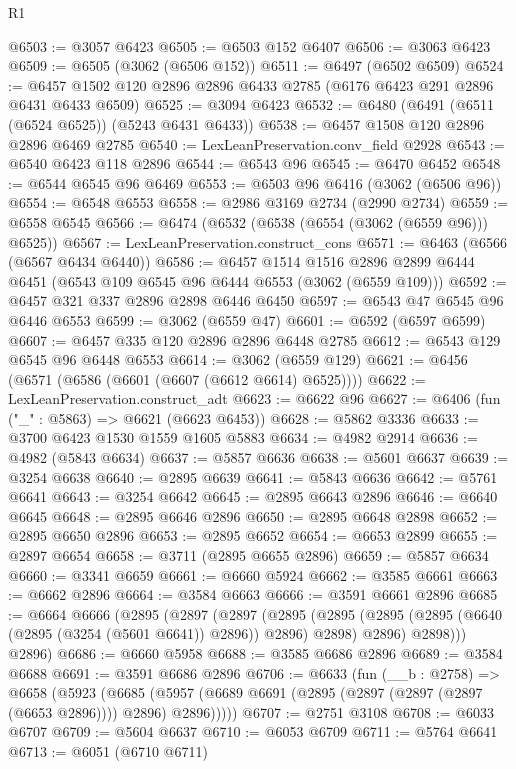 \begin{lexlean}{R1}
\begin{coremodule}
@6503 := @3057 @6423
@6505 := @6503 @152 @6407
@6506 := @3063 @6423
@6509 := @6505 (@3062 (@6506 @152))
@6511 := @6497 (@6502 @6509)
@6524 := @6457 @1502 @120 @2896 @2896 @6433 @2785 (@6176 @6423 @291 @2896 @6431 @6433 @6509)
@6525 := @3094 @6423
@6532 := @6480 (@6491 (@6511 (@6524 @6525)) (@5243 @6431 @6433))
@6538 := @6457 @1508 @120 @2896 @2896 @6469 @2785
@6540 := LexLeanPreservation.conv_field @2928
@6543 := @6540 @6423 @118 @2896
@6544 := @6543 @96
@6545 := @6470 @6452
@6548 := @6544 @6545 @96 @6469
@6553 := @6503 @96 @6416 (@3062 (@6506 @96))
@6554 := @6548 @6553
@6558 := @2986 @3169 @2734 (@2990 @2734)
@6559 := @6558 @6545
@6566 := @6474 (@6532 (@6538 (@6554 (@3062 (@6559 @96))) @6525))
@6567 := LexLeanPreservation.construct_cons
@6571 := @6463 (@6566 (@6567 @6434 @6440))
@6586 := @6457
    @1514
    @1516
    @2896
    @2899
    @6444
    @6451
    (@6543 @109 @6545 @96 @6444 @6553 (@3062 (@6559 @109)))
@6592 := @6457 @321 @337 @2896 @2898 @6446 @6450
@6597 := @6543 @47 @6545 @96 @6446 @6553
@6599 := @3062 (@6559 @47)
@6601 := @6592 (@6597 @6599)
@6607 := @6457 @335 @120 @2896 @2896 @6448 @2785
@6612 := @6543 @129 @6545 @96 @6448 @6553
@6614 := @3062 (@6559 @129)
@6621 := @6456 (@6571 (@6586 (@6601 (@6607 (@6612 @6614) @6525))))
@6622 := LexLeanPreservation.construct_adt
@6623 := @6622 @96
@6627 := @6406 (fun ("_" : @5863) => @6621 (@6623 @6453))
@6628 := @5862 @3336
@6633 := @3700 @6423 @1530 @1559 @1605 @5883
@6634 := @4982 @2914
@6636 := @4982 (@5843 @6634)
@6637 := @5857 @6636
@6638 := @5601 @6637
@6639 := @3254 @6638
@6640 := @2895 @6639
@6641 := @5843 @6636
@6642 := @5761 @6641
@6643 := @3254 @6642
@6645 := @2895 @6643 @2896
@6646 := @6640 @6645
@6648 := @2895 @6646 @2896
@6650 := @2895 @6648 @2898
@6652 := @2895 @6650 @2896
@6653 := @2895 @6652
@6654 := @6653 @2899
@6655 := @2897 @6654
@6658 := @3711 (@2895 @6655 @2896)
@6659 := @5857 @6634
@6660 := @3341 @6659
@6661 := @6660 @5924
@6662 := @3585 @6661
@6663 := @6662 @2896
@6664 := @3584 @6663
@6666 := @3591 @6661 @2896
@6685 := @6664
    @6666
    (@2895
      (@2897
        (@2897
          (@2895
            (@2895 (@2895 (@2895 (@6640 (@2895 (@3254 (@5601 @6641)) @2896)) @2896) @2898) @2896)
            @2898)))
      @2896)
@6686 := @6660 @5958
@6688 := @3585 @6686 @2896
@6689 := @3584 @6688
@6691 := @3591 @6686 @2896
@6706 := @6633
    (fun (__b : @2758) =>
    @6658
      (@5923
        (@6685 (@5957 (@6689 @6691 (@2895 (@2897 (@2897 (@2897 (@6653 @2896)))) @2896) @2896)))))
@6707 := @2751 @3108
@6708 := @6033 @6707
@6709 := @5604 @6637
@6710 := @6053 @6709
@6711 := @5764 @6641
@6713 := @6051 (@6710 @6711)

\end{coremodule}
\end{lexlean}

